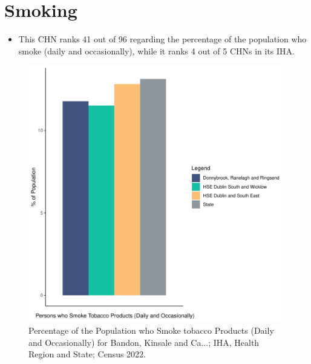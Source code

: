 \documentclass{article}
\begin{document}
\pagebreak

\section{Smoking}\label{sect:Smoking}
\begin{itemize}
\item This CHN ranks  41 out of 96 regarding the percentage of the population who smoke (daily and occasionally), while it ranks   4 out of 5 CHNs in its IHA.
\end{itemize}
\begin{figure}[H]
	\centering
	\includegraphics[width = 120mm]{../figures/SmokingED.pdf}
	\caption{Percentage of the Population who Smoke tobacco Products (Daily and Occasionally) for Bandon, Kinsale and Ca...; IHA, Health Region and State; Census 2022.}
	\label{fig:2ae19629-1a6a-13a3-e055-000000000001}
	\end{figure}
	
\end{document}
